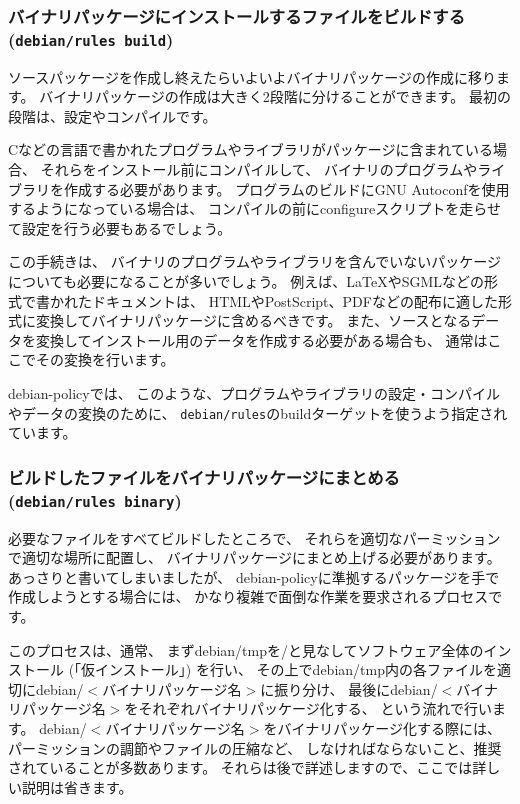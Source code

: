 \documentclass[mingoth,a4paper]{jsarticle}
\begin{document}
\subsubsection{バイナリパッケージにインストールするファイルをビルドする (\texttt{debian/rules build})}

ソースパッケージを作成し終えたらいよいよバイナリパッケージの作成に移ります。
バイナリパッケージの作成は大きく2段階に分けることができます。
最初の段階は、設定やコンパイルです。

Cなどの言語で書かれたプログラムやライブラリがパッケージに含まれている場合、
それらをインストール前にコンパイルして、
バイナリのプログラムやライブラリを作成する必要があります。
プログラムのビルドにGNU Autoconfを使用するようになっている場合は、
コンパイルの前にconfigureスクリプトを走らせて設定を行う必要もあるでしょう。

この手続きは、
バイナリのプログラムやライブラリを含んでいないパッケージについても必要になることが多いでしょう。
例えば、\LaTeX{}やSGMLなどの形式で書かれたドキュメントは、
HTMLやPostScript、PDFなどの配布に適した形式に変換してバイナリパッケージに含めるべきです。
また、ソースとなるデータを変換してインストール用のデータを作成する必要がある場合も、
通常はここでその変換を行います。

debian-policyでは、
このような、プログラムやライブラリの設定・コンパイルやデータの変換のために、
\texttt{debian/rules}のbuildターゲットを使うよう指定されています。


\subsubsection{ビルドしたファイルをバイナリパッケージにまとめる (\texttt{debian/rules binary})}

必要なファイルをすべてビルドしたところで、
それらを適切なパーミッションで適切な場所に配置し、
バイナリパッケージにまとめ上げる必要があります。
あっさりと書いてしまいましたが、
debian-policyに準拠するパッケージを手で作成しようとする場合には、
かなり複雑で面倒な作業を要求されるプロセスです。

このプロセスは、通常、
まずdebian/tmpを/と見なしてソフトウェア全体のインストール (「仮インストール」) を行い、
その上でdebian/tmp内の各ファイルを適切にdebian/$<$バイナリパッケージ名$>$に振り分け、
最後にdebian/$<$バイナリパッケージ名$>$をそれぞれバイナリパッケージ化する、
という流れで行います。
debian/$<$バイナリパッケージ名$>$をバイナリパッケージ化する際には、
パーミッションの調節やファイルの圧縮など、
しなければならないこと、推奨されていることが多数あります。
それらは後で詳述しますので、ここでは詳しい説明は省きます。
\end{document}
